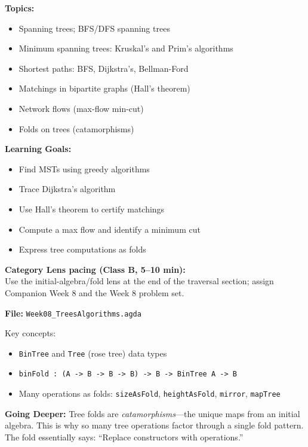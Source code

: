 \documentclass[11pt]{article}
\begin{document}
\begin{classbbox}
\textbf{Topics:}
\begin{itemize}
    \item Spanning trees; BFS/DFS spanning trees
    \item Minimum spanning trees: Kruskal's and Prim's algorithms
    \item Shortest paths: BFS, Dijkstra's, Bellman-Ford
    \item Matchings in bipartite graphs (Hall's theorem)
    \item Network flows (max-flow min-cut)
    \item Folds on trees (catamorphisms)
\end{itemize}

\textbf{Learning Goals:}
\begin{itemize}
    \item Find MSTs using greedy algorithms
    \item Trace Dijkstra's algorithm
    \item Use Hall's theorem to certify matchings
    \item Compute a max flow and identify a minimum cut
    \item Express tree computations as folds
\end{itemize}
\end{classbbox}

\textbf{Category Lens pacing (Class B, 5--10 min):}\\
Use the initial-algebra/fold lens at the end of the traversal section; assign Companion Week 8 and the Week 8 problem set.

\begin{agdabox}
\textbf{File:} \texttt{Week08\_TreesAlgorithms.agda}

Key concepts:
\begin{itemize}
    \item \texttt{BinTree} and \texttt{Tree} (rose tree) data types
    \item \texttt{binFold : (A -> B -> B -> B) -> B -> BinTree A -> B}
    \item Many operations as folds: \texttt{sizeAsFold}, \texttt{heightAsFold}, \texttt{mirror}, \texttt{mapTree}
\end{itemize}

\textbf{Going Deeper:} Tree folds are \textit{catamorphisms}---the unique maps from an initial algebra. This is why so many tree operations factor through a single fold pattern. The fold essentially says: ``Replace constructors with operations.''
\end{agdabox}
\end{document}
